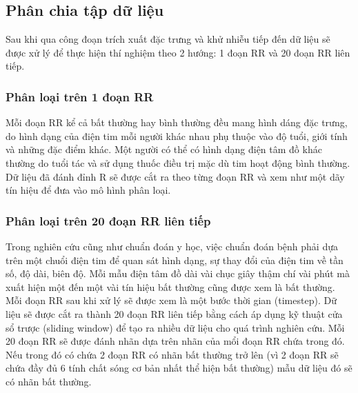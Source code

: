 \subsection{Phân chia tập dữ liệu}
Sau khi qua công đoạn trích xuất đặc trưng và khử nhiễu tiếp đến dữ liệu sẽ được xử lý để thực hiện thí nghiệm theo 2 hướng: 1 đoạn RR và 20 đoạn RR liên tiếp.
\subsubsection{Phân loại trên 1 đoạn RR}
Mỗi đoạn RR kể cả bất thường hay bình thường đều mang hình dáng đặc trưng, do hình dạng của điện tim mỗi người khác nhau phụ thuộc vào độ tuổi, giới tính và những đặc điểm khác. Một người có thể có hình dạng điện tâm đồ khác thường do tuổi tác và sử dụng thuốc điều trị mặc dù tim hoạt động bình thường. Dữ liệu đã đánh đỉnh R sẽ được cắt ra theo từng đoạn RR và xem như một dãy tín hiệu để đưa vào mô hình phân loại.

\subsubsection{Phân loại trên 20 đoạn RR liên tiếp}
Trong nghiên cứu cũng như chuẩn đoán y học, việc chuẩn đoán bệnh phải dựa trên một chuổi điện tim để quan sát hình dạng, sự thay đổi của điện tim về tần số, độ dài, biên độ. Mỗi mẫu điện tâm đồ dài vài chục giây thậm chí vài phút mà xuất hiện một đến một vài tín hiệu bất thường cũng được xem là bất thường. Mỗi đoạn RR sau khi xử lý sẽ được xem là một bước thời gian (timestep). Dữ liệu sẽ được cắt ra thành 20 đoạn RR liên tiếp bằng cách áp dụng kỹ thuật cửa sổ trược (sliding window) để tạo ra nhiều dữ liệu cho quá trình nghiên cứu. Mỗi 20 đoạn RR sẽ được đánh nhãn dựa trên nhãn của mổi đoạn RR chứa trong đó. Nếu trong đó có chứa 2 đoạn RR có nhãn bất thường trở lên (vì 2 đoạn RR sẽ chứa đầy đủ 6 tính chất sóng cơ bản nhất thể hiện bất thường) mẫu dữ liệu đó sẽ có nhãn bất thường.

